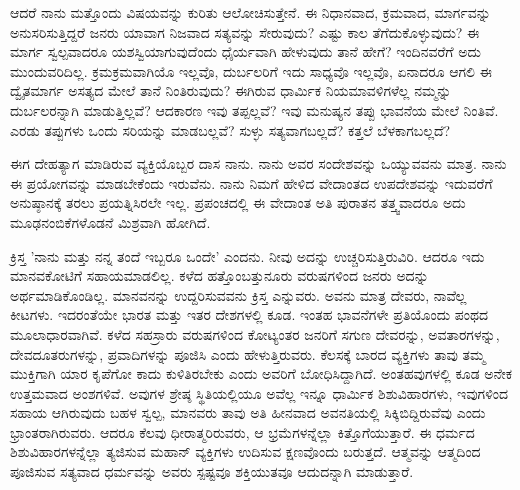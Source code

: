 ಆದರೆ ನಾನು ಮತ್ತೊಂದು ವಿಷಯವನ್ನು ಕುರಿತು ಆಲೋಚಿಸುತ್ತೇನೆ. ಈ ನಿಧಾನವಾದ, ಕ್ರಮವಾದ, ಮಾರ್ಗವನ್ನು ಅನುಸರಿಸುತ್ತಿದ್ದರೆ ಜನರು ಯಾವಾಗ ನಿಜವಾದ ಸತ್ಯವನ್ನು ಸೇರುವುದು? ಎಷ್ಟು ಕಾಲ ತೆಗೆದುಕೊಳ್ಳುವುದು? ಈ ಮಾರ್ಗ ಸ್ವಲ್ಪವಾದರೂ ಯಶಸ್ವಿಯಾಗುವುದೆಂದು ಧೈರ್ಯವಾಗಿ ಹೇಳುವುದು ತಾನೆ ಹೇಗೆ? ಇಂದಿನವರೆಗೆ ಅದು ಮುಂದುವರಿದಿಲ್ಲ. ಕ್ರಮಕ್ರಮವಾಗಿಯೊ ಇಲ್ಲವೊ, ದುರ್ಬಲರಿಗೆ ಇದು ಸಾಧ್ಯವೊ ಇಲ್ಲವೊ, ಏನಾದರೂ ಆಗಲಿ ಈ ದ್ವೈತಮಾರ್ಗ ಅಸತ್ಯದ ಮೇಲೆ ತಾನೆ ನಿಂತಿರುವುದು? ಈಗಿರುವ ಧಾರ್ಮಿಕ ನಿಯಮಾವಳಿಗಳೆಲ್ಲ ನಮ್ಮನ್ನು ದುರ್ಬಲರನ್ನಾಗಿ ಮಾಡುತ್ತಿಲ್ಲವೆ? ಆದಕಾರಣ ಇವು ತಪ್ಪಲ್ಲವೆ? ಇವು ಮನುಷ್ಯನ ತಪ್ಪು ಭಾವನೆಯ ಮೇಲೆ ನಿಂತಿವೆ. ಎರಡು ತಪ್ಪುಗಳು ಒಂದು ಸರಿಯನ್ನು ಮಾಡಬಲ್ಲವೆ? ಸುಳ್ಳು ಸತ್ಯವಾಗಬಲ್ಲದೆ? ಕತ್ತಲೆ ಬೆಳಕಾಗಬಲ್ಲದೆ?

ಈಗ ದೇಹತ್ಯಾಗ ಮಾಡಿರುವ ವ್ಯಕ್ತಿಯೊಬ್ಬರ ದಾಸ ನಾನು. ನಾನು ಅವರ ಸಂದೇಶವನ್ನು ಒಯ್ಯುವವನು ಮಾತ್ರ. ನಾನು ಈ ಪ್ರಯೋಗವನ್ನು ಮಾಡಬೇಕೆಂದು ಇರುವೆನು. ನಾನು ನಿಮಗೆ ಹೇಳಿದ ವೇದಾಂತದ ಉಪದೇಶವನ್ನು ಇದುವರೆಗೆ ಅನುಷ್ಠಾನಕ್ಕೆ ತರಲು ಪ್ರಯತ್ನಿಸಿರಲೇ ಇಲ್ಲ. ಪ್ರಪಂಚದಲ್ಲಿ ಈ ವೇದಾಂತ ಅತಿ ಪುರಾತನ ತತ್ತ್ವವಾದರೂ ಅದು ಮೂಢನಂಬಿಕೆಗಳೊಡನೆ ಮಿಶ್ರವಾಗಿ ಹೋಗಿದೆ.

ಕ್ರಿಸ್ತ 'ನಾನು ಮತ್ತು ನನ್ನ ತಂದೆ ಇಬ್ಬರೂ ಒಂದೇ' ಎಂದನು. ನೀವು ಅದನ್ನು ಉಚ್ಚರಿಸುತ್ತಿರುವಿರಿ. ಆದರೂ ಇದು ಮಾನವಕೋಟಿಗೆ ಸಹಾಯಮಾಡಲಿಲ್ಲ. ಕಳೆದ ಹತ್ತೊಂಬತ್ತುನೂರು ವರುಷಗಳಿಂದ ಜನರು ಅದನ್ನು ಅರ್ಥಮಾಡಿಕೊಂಡಿಲ್ಲ. ಮಾನವನನ್ನು ಉದ್ದರಿಸುವವನು ಕ್ರಿಸ್ತ ಎನ್ನುವರು. ಅವನು ಮಾತ್ರ ದೇವರು, ನಾವೆಲ್ಲ ಕೀಟಗಳು. ಇದರಂತೆಯೇ ಭಾರತ ಮತ್ತು ಇತರ ದೇಶಗಳಲ್ಲಿ ಕೂಡ. ಇಂತಹ ಭಾವನೆಗಳೇ ಪ್ರತಿಯೊಂದು ಪಂಥದ ಮೂಲಾಧಾರವಾಗಿವೆ. ಕಳೆದ ಸಹಸ್ರಾರು ವರುಷಗಳಿಂದ ಕೋಟ್ಯಂತರ ಜನರಿಗೆ ಸಗುಣ ದೇವರನ್ನು, ಅವತಾರಗಳನ್ನು, ದೇವದೂತರುಗಳನ್ನು, ಪ್ರವಾದಿಗಳನ್ನು ಪೂಜಿಸಿ ಎಂದು ಹೇಳುತ್ತಿರುವರು. ಕೆಲಸಕ್ಕೆ ಬಾರದ ವ್ಯಕ್ತಿಗಳು ತಾವು ತಮ್ಮ ಮುಕ್ತಿಗಾಗಿ ಯಾರ ಕೃಪೆಗೋ ಕಾದು ಕುಳಿತಿರಬೇಕು ಎಂದು ಅವರಿಗೆ ಬೋಧಿಸಿದ್ದಾಗಿದೆ. ಅಂತಹವುಗಳಲ್ಲಿ ಕೂಡ ಅನೇಕ ಉತ್ತಮವಾದ ಅಂಶಗಳಿವೆ. ಅವುಗಳ ಶ್ರೇಷ್ಠ ಸ್ಥಿತಿಯಲ್ಲಿಯೂ ಅವೆಲ್ಲ ಇನ್ನೂ ಧಾರ್ಮಿಕ ಶಿಶುವಿಹಾರಗಳು, ಇವುಗಳಿಂದ ಸಹಾಯ ಆಗಿರುವುದು ಬಹಳ ಸ್ವಲ್ಪ, ಮಾನವರು ತಾವು ಅತಿ ಹೀನವಾದ ಅವನತಿಯಲ್ಲಿ ಸಿಕ್ಕಿಬಿದ್ದಿರುವೆವು ಎಂದು ಭ್ರಾಂತರಾಗಿರುವರು. ಆದರೂ ಕೆಲವು ಧೀರಾತ್ಮರಿರುವರು, ಆ ಭ್ರಮೆಗಳನ್ನೆಲ್ಲಾ ಕಿತ್ತೊಗೆಯುತ್ತಾರೆ. ಈ ಧರ್ಮದ ಶಿಶುವಿಹಾರಗಳನ್ನೆಲ್ಲಾ ತ್ಯಜಿಸುವ ಮಹಾನ್ ವ್ಯಕ್ತಿಗಳು ಉದಿಸುವ ಕ್ಷಣವೊಂದು ಬರುತ್ತದೆ. ಆತ್ಮವನ್ನು ಆತ್ಮದಿಂದ ಪೂಜಿಸುವ ಸತ್ಯವಾದ ಧರ್ಮವನ್ನು ಅವರು ಸ್ಪಷ್ಟವೂ ಶಕ್ತಿಯುತವೂ ಆದುದನ್ನಾಗಿ ಮಾಡುತ್ತಾರೆ.

